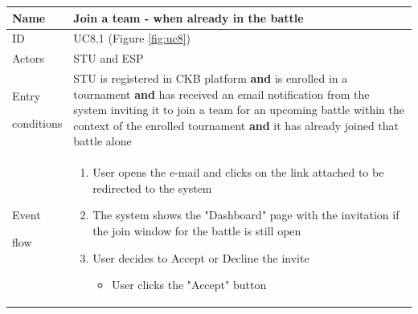 \begin{center}
    \def\arraystretch{1.5}
    \begin{tabular}{| m{2cm} | m{10cm}|}
        \hline
        Name                  & Join a team - when already in the battle                                                                                                                                                                                                                                                            \\ \hline
        ID                    & UC8.1 (Figure \ref{fig:uc8})                                                                                                                                                                                                                                                                        \\ \hline
        Actors                & STU and ESP                                                                                                                                                                                                                                                                                                 \\ \hline
        Entry \par conditions & STU is registered in CKB platform \textbf{and} is enrolled in a tournament \textbf{and} has received an email notification from the system inviting it to join a team for an upcoming battle within the context of the enrolled tournament \textbf{and} it has already joined that battle alone     \\ \hline
        Event \par flow       & \begin{enumerate}
                                    \item User opens the e-mail and clicks on the link attached to be redirected to the system
                                    \item The system shows the "Dashboard" page with the invitation if the join window for the battle is still open
                                    \item User decides to Accept or Decline the invite
                                    \begin{itemize}
                                        \item User clicks the "Accept" button
                                    \end{itemize}

\end{enumerate}
\end{tabular}
\end{center}
